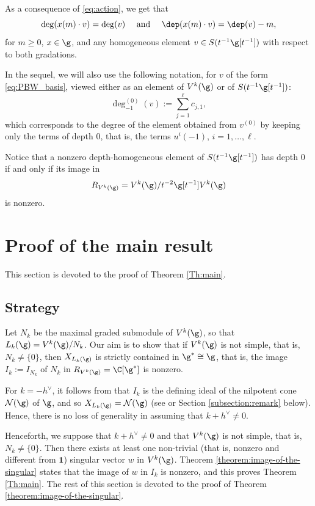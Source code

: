 As a consequence of \eqref{eq:action}, we get that
\begin{equation}
\label{eq:homogeneous}
\deg(x(m)\cdot v) = \deg(v) \quad \text{ and }
\quad \dep(x(m)\cdot v)= \dep(v) - m,
\end{equation}
for
$m\geq 0$, $x\in\g$, and any homogeneous element $v \in S(t^{-1}\g[t^{-1}])$
with respect to both gradations.

In the sequel, we will also
use the following notation, for $v$ of the form \eqref{eq:PBW_basis},
viewed either as an element of $V^k(\g)$ or of $S(t^{-1}\g[t^{-1}])$:
\begin{equation}
\label{eq:deg_-1}
\deg_{-1}^{(0)}(v) :=
\sum_{j=1}^\ell c_{j,1 },
\end{equation}
which corresponds to the degree of the element
obtained from $v^{(0)}$ by keeping only the terms of
depth $0$, that is, the terms $u^{i}(-1)$, $i=1,\dots,\ell$.

Notice that a nonzero depth-homogeneous
element of $S(t^{-1}\g[t^{-1}])$ has depth $0$ if
and only if
its image in
\[
R_{V^k(\g)} = V^k(\g)/t^{-2} \g[t^{-1}] V^k(\g)
\]
is nonzero.
\section{Proof of the main result}
\label{sec:main_proof}

This section is devoted to the proof of Theorem \ref{Th:main}.

\subsection{Strategy}
{Let $N_k$ be the maximal graded submodule of $V^k(\g)$,
so that $L_k(\g)=V^k(\g)/N_k$.
Our aim is to show that if $V^k(\g)$ is not simple, that is,
$N_k\not=\{0\}$, then $X_{L_k(\g)}$
is strictly contained in $\g^*\cong\g$, that is,
the image $I_k:=I_{N_k}$ of $N_k$ in
$R_{V^k(\g)}=\C[\g^*]$ is nonzero.}

For $k=-h^\vee$, it follows from \cite{FreGai04} that
$I_k$ is the defining ideal of the
nilpotent
cone $ \mathcal{N}(\g)$ of $\g$,
and so
$X_{L_k(\g)} = \mathcal{N}(\g)$ (see \cite{A11} or Section \ref{subsection:remark}
below).
Hence, there is no loss of generality in assuming that $k+h^\vee \not=0$.

Henceforth, we suppose that $k+h^\vee \not=0$ and
that $V^k(\g)$ is not simple,
that is,
$N_k\ne \{0\}$.
Then there exists at least
one non-trivial (that is, nonzero and different from
$\mathbf{1}$) singular vector $w$
in $V^k(\g)$.
Theorem \ref{theorem:image-of-the-singular}
states that
the image of $w$ in $I_k$ is nonzero,
and
this proves
Theorem \ref{Th:main}. The rest of this section is devoted
to the proof of Theorem \ref{theorem:image-of-the-singular}.

